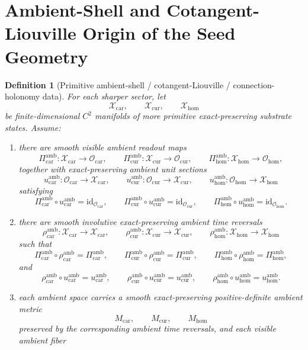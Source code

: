 \documentclass[11pt]{article}
\newcommand{\TensorObjClass}{\mathcal O_{\mathrm{car}}}
\newcommand{\CurObjClass}{\mathcal O_{\mathrm{cur}}}
\newcommand{\HomObjClass}{\mathcal O_{\mathrm{hom}}}
\newcommand{\TensorAmbientSpace}{\mathcal X_{\mathrm{car}}}
\newcommand{\CurAmbientSpace}{\mathcal X_{\mathrm{cur}}}
\newcommand{\HomAmbientSpace}{\mathcal X_{\mathrm{hom}}}
\newcommand{\TensorAmbientRead}{\Pi_{\mathrm{car}}^{\mathrm{amb}}}
\newcommand{\CurAmbientRead}{\Pi_{\mathrm{cur}}^{\mathrm{amb}}}
\newcommand{\HomAmbientRead}{\Pi_{\mathrm{hom}}^{\mathrm{amb}}}
\newcommand{\TensorAmbientUnit}{u_{\mathrm{car}}^{\mathrm{amb}}}
\newcommand{\CurAmbientUnit}{u_{\mathrm{cur}}^{\mathrm{amb}}}
\newcommand{\HomAmbientUnit}{u_{\mathrm{hom}}^{\mathrm{amb}}}
\newcommand{\TensorAmbientTimeRev}{\rho_{\mathrm{car}}^{\mathrm{amb}}}
\newcommand{\CurAmbientTimeRev}{\rho_{\mathrm{cur}}^{\mathrm{amb}}}
\newcommand{\HomAmbientTimeRev}{\rho_{\mathrm{hom}}^{\mathrm{amb}}}
\newcommand{\TensorAmbientMetric}{M_{\mathrm{car}}}
\newcommand{\CurAmbientMetric}{M_{\mathrm{cur}}}
\newcommand{\HomAmbientMetric}{M_{\mathrm{hom}}}
\newtheorem{definition}{Definition}
\begin{document}
\section{Ambient-Shell and Cotangent-Liouville Origin of the Seed Geometry}

\begin{definition}[Primitive ambient-shell / cotangent-Liouville / connection-holonomy data]
\label{def:ambient_geometry}
For each sharper sector, let
\[
\TensorAmbientSpace,\qquad
\CurAmbientSpace,\qquad
\HomAmbientSpace
\]
be finite-dimensional \(C^2\) manifolds of more primitive exact-preserving substrate states. Assume:
\begin{enumerate}
    \item there are smooth visible ambient readout maps
    \[
    \TensorAmbientRead:\TensorAmbientSpace\to\TensorObjClass,\qquad
    \CurAmbientRead:\CurAmbientSpace\to\CurObjClass,\qquad
    \HomAmbientRead:\HomAmbientSpace\to\HomObjClass,
    \]
    together with exact-preserving ambient unit sections
    \[
    \TensorAmbientUnit:\TensorObjClass\to\TensorAmbientSpace,\qquad
    \CurAmbientUnit:\CurObjClass\to\CurAmbientSpace,\qquad
    \HomAmbientUnit:\HomObjClass\to\HomAmbientSpace
    \]
    satisfying
    \[
    \TensorAmbientRead\circ\TensorAmbientUnit=\mathrm{id}_{\TensorObjClass},\qquad
    \CurAmbientRead\circ\CurAmbientUnit=\mathrm{id}_{\CurObjClass},\qquad
    \HomAmbientRead\circ\HomAmbientUnit=\mathrm{id}_{\HomObjClass}.
    \]
    \item there are smooth involutive exact-preserving ambient time reversals
    \[
    \TensorAmbientTimeRev:\TensorAmbientSpace\to\TensorAmbientSpace,\qquad
    \CurAmbientTimeRev:\CurAmbientSpace\to\CurAmbientSpace,\qquad
    \HomAmbientTimeRev:\HomAmbientSpace\to\HomAmbientSpace
    \]
    such that
    \[
    \TensorAmbientRead\circ\TensorAmbientTimeRev=\TensorAmbientRead,\qquad
    \CurAmbientRead\circ\CurAmbientTimeRev=\CurAmbientRead,\qquad
    \HomAmbientRead\circ\HomAmbientTimeRev=\HomAmbientRead,
    \]
    and
    \[
    \TensorAmbientTimeRev\circ\TensorAmbientUnit=\TensorAmbientUnit,\qquad
    \CurAmbientTimeRev\circ\CurAmbientUnit=\CurAmbientUnit,\qquad
    \HomAmbientTimeRev\circ\HomAmbientUnit=\HomAmbientUnit.
    \]
    \item each ambient space carries a smooth exact-preserving positive-definite ambient metric
    \[
    \TensorAmbientMetric,\qquad
    \CurAmbientMetric,\qquad
    \HomAmbientMetric
    \]
    preserved by the corresponding ambient time reversals, and each visible ambient fiber

\end{enumerate}
\end{definition}
\end{document}
